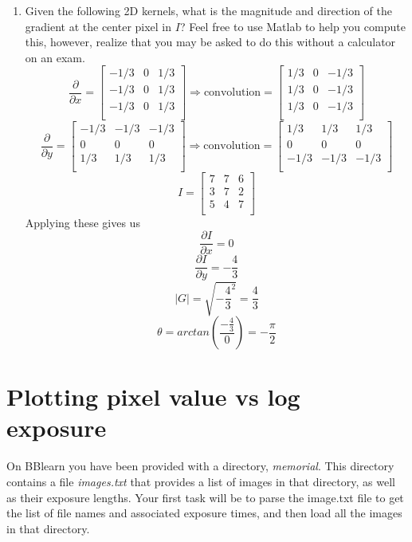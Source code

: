 \documentclass{article}
\begin{document}
\begin{enumerate}
\item Given the following 2D kernels, what is the magnitude and direction of the gradient at the center pixel in $I$?  Feel free to use Matlab to help you compute this, however, realize that you may be asked to do this without a calculator on an exam.
\begin{equation}
\frac{\partial}{\partial x} = \begin{bmatrix}
-1/3 & 0 & 1/3\\
-1/3 & 0 & 1/3\\
-1/3 & 0 & 1/3\\
\end{bmatrix}
\Rightarrow
\text{convolution} = \begin{bmatrix}
1/3 & 0 & -1/3\\
1/3 & 0 & -1/3\\
1/3 & 0 & -1/3\\
\end{bmatrix}
\end{equation}
\begin{equation}
\frac{\partial}{\partial y} = \begin{bmatrix}
-1/3 & -1/3 & -1/3\\
0 & 0 & 0\\
1/3 & 1/3 & 1/3\\
\end{bmatrix}
\Rightarrow
\text{convolution} = \begin{bmatrix}
1/3 & 1/3 & 1/3\\
0 & 0 & 0\\
-1/3 & -1/3 & -1/3\\
\end{bmatrix}
\end{equation}
\begin{equation}
I=
\begin{bmatrix}
7 & 7 & 6\\
3 & 7 & 2\\
5 & 4 & 7\\
\end{bmatrix}
\end{equation}
Applying these gives us
$$ \frac{\partial I}{\partial x} = 0 $$
$$ \frac{\partial I}{\partial y} = -\frac{4}{3} $$
$$ |G| = \sqrt{{-\frac{4}{3}}^2}  = \frac{4}{3}$$
$$ \theta = arctan(\frac{-\frac{4}{3}}{0}) = -\frac{\pi}{2} $$

\end{enumerate}

\newpage

\section{Plotting pixel value vs log exposure}
On BBlearn you have been provided with a directory, \emph{memorial}.  This directory contains a file \emph{images.txt} that provides a list of images in that directory, as well as their exposure lengths.  Your first task will be to parse the image.txt file to get the list of file names and associated exposure times, and then load all the images in that directory.\\
\end{document}
